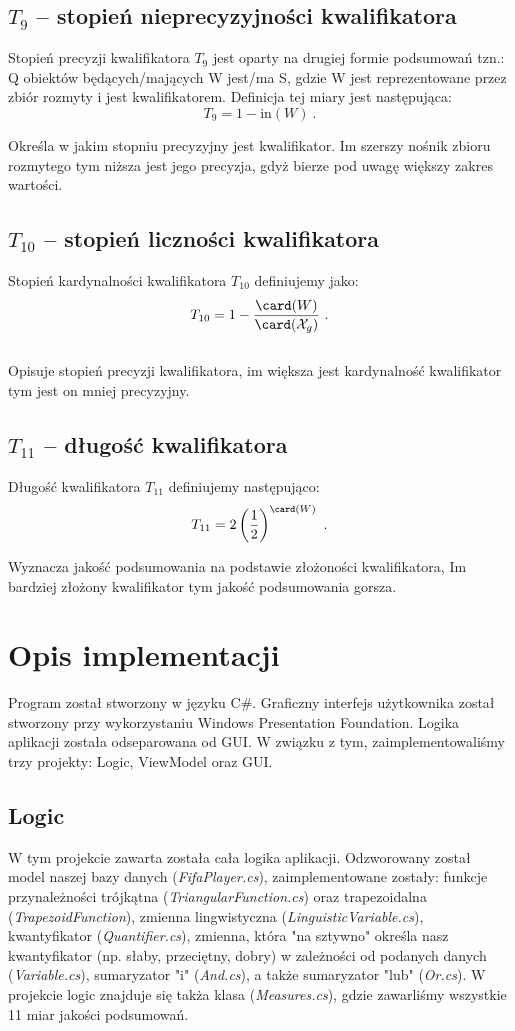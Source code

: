 \documentclass{classrep}
\begin{document}
\subsection{\(T_9\) -- stopień nieprecyzyjności kwalifikatora}
Stopień precyzji kwalifikatora \(T_9\) jest oparty na drugiej formie podsumowań tzn.: Q obiektów będących/mających W jest/ma S, gdzie W jest reprezentowane przez zbiór rozmyty i jest kwalifikatorem. Definicja tej miary jest następująca:
\[T_9 = 1-\mathrm{in}(W) ~\mbox{.}\]

Określa w jakim stopniu precyzyjny jest kwalifikator. Im szerszy nośnik zbioru rozmytego tym niższa jest jego precyzja, gdyż bierze pod uwagę większy zakres wartości. 


\subsection{\(T_{10}\) -- stopień liczności kwalifikatora}
Stopień kardynalności kwalifikatora \(T_{10}\) definiujemy jako:
\[T_{10} = 1-\frac{\card(W)}{\card(\mathcal{X}_g)} ~\mbox{.}\]\\

Opisuje stopień precyzji kwalifikatora, im większa jest kardynalność kwalifikator tym jest on mniej precyzyjny.

\subsection{\(T_{11}\) -- długość kwalifikatora}
Długość kwalifikatora \(T_{11}\) definiujemy następująco:
\[T_{11} = 2\left(\frac{1}{2}\right)^{\card({W})} ~\mbox{.}\]

Wyznacza jakość podsumowania na podstawie złożoności kwalifikatora, Im bardziej złożony kwalifikator tym jakość podsumowania gorsza.

\vspace\baselineskip

\section{Opis implementacji}
Program został stworzony w języku C\#. Graficzny interfejs użytkownika został stworzony przy  wykorzystaniu Windows Presentation Foundation. Logika aplikacji została odseparowana od GUI. W związku z tym, zaimplementowaliśmy trzy projekty: Logic, ViewModel oraz GUI.

\subsection{Logic}
W tym projekcie zawarta została cała logika aplikacji. Odzworowany został model naszej bazy danych (\emph{FifaPlayer.cs}), zaimplementowane zostały: funkcje przynależności trójkątna (\emph{TriangularFunction.cs}) oraz trapezoidalna (\emph{TrapezoidFunction}), zmienna lingwistyczna (\emph{LinguisticVariable.cs}), kwantyfikator (\emph{Quantifier.cs}), zmienna, która "na sztywno" określa nasz kwantyfikator (np. słaby, przeciętny, dobry) w zależności od podanych danych (\emph{Variable.cs}), sumaryzator "i" (\emph{And.cs}), a także sumaryzator "lub" (\emph{Or.cs}). W projekcie logic znajduje się takża klasa (\emph{Measures.cs}), gdzie zawarliśmy wszystkie 11 miar jakości podsumowań.
 
\end{document}
